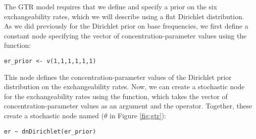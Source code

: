 The GTR model requires that we define and specify a prior on the six exchangeability rates, which we will describe using a flat Dirichlet distribution.
As we did previously for the Dirichlet prior on base frequencies, we first define a constant node specifying the vector of concentration-parameter values using the  function:
{\tt \begin{snugshade*}
\begin{lstlisting}
er_prior <- v(1,1,1,1,1,1) 
\end{lstlisting}
\end{snugshade*}}
This node defines the concentration-parameter values of the Dirichlet prior distribution on the exchangeability rates. 
Now, we can create a stochastic node for the exchangeability rates using the  function, which takes the vector of concentration-parameter values as an argument and the \cl{\rbdn} operator. 
Together, these create a stochastic node named  ($\theta$ in Figure \ref{fig:gtr}): 
{\tt \begin{snugshade*}
\begin{lstlisting}
er ~ dnDirichlet(er_prior)
\end{lstlisting}
\end{snugshade*}}


